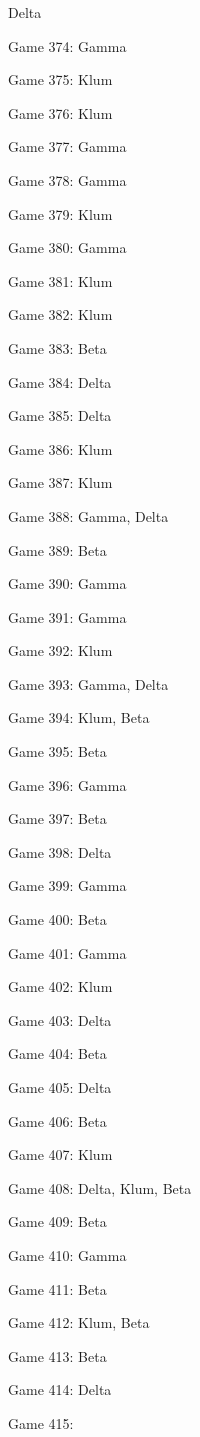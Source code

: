 \documentclass{article}
\begin{document}
\begin{multicols}{3}
\begin{compactitem}
Delta
\item Game 374:
Gamma
\item Game 375:
Klum
\item Game 376:
Klum
\item Game 377:
Gamma
\item Game 378:
Gamma
\item Game 379:
Klum
\item Game 380:
Gamma
\item Game 381:
Klum
\item Game 382:
Klum
\item Game 383:
Beta
\item Game 384:
Delta
\item Game 385:
Delta
\item Game 386:
Klum
\item Game 387:
Klum
\item Game 388:
Gamma, Delta
\item Game 389:
Beta
\item Game 390:
Gamma
\item Game 391:
Gamma
\item Game 392:
Klum
\item Game 393:
Gamma, Delta
\item Game 394:
Klum, Beta
\item Game 395:
Beta
\item Game 396:
Gamma
\item Game 397:
Beta
\item Game 398:
Delta
\item Game 399:
Gamma
\item Game 400:
Beta
\item Game 401:
Gamma
\item Game 402:
Klum
\item Game 403:
Delta
\item Game 404:
Beta
\item Game 405:
Delta
\item Game 406:
Beta
\item Game 407:
Klum
\item Game 408:
Delta, Klum, Beta
\item Game 409:
Beta
\item Game 410:
Gamma
\item Game 411:
Beta
\item Game 412:
Klum, Beta
\item Game 413:
Beta
\item Game 414:
Delta
\item Game 415:

\end{compactitem}
\end{multicols}
\end{document}
